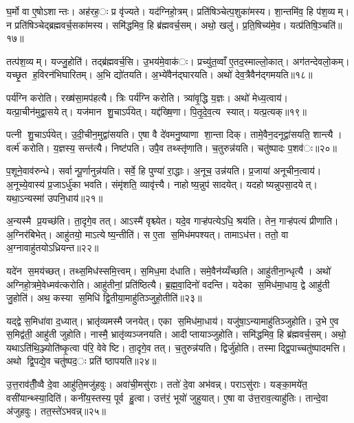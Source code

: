 घ॒र्मो वा ए॒षोऽशान्तः। अह॑रह॒ः प्र वृ॑ज्यते। यद॑ग्निहो॒त्रम्। प्रति॑षिञ्चेत्प॒शुका॑मस्य। शा॒न्तमि॑व॒ हि प॑श॒व्यम्। न प्रति॑षिञ्चेद्ब्रह्मवर्च॒सका॑मस्य। समि॑द्धमिव॒ हि ब्र॑ह्मवर्च॒सम्। अथो॒ खलु॑। प्र॒ति॒षिच्य॑मे॒व। यत्प्र॑तिषि॒ञ्चति॑॥१७॥

तत्प॑श॒व्यम्। यज्जु॒होति॑। तद्ब्र॑ह्मवर्च॒सि। उ॒भय॑मे॒वाक॑ः। प्रच्यु॑त॒व्वाँ ए॒तद॒स्माल्लो॒कात्। अग॑तन्देवलो॒कम्। यच्छृ॒त ह॒विरन॑भिघारितम्। अ॒भि द्यो॑तयति। अ॒भ्ये॑वैन॑द्घारयति। अथो॑ देव॒त्रैवैन॑द्गमयति॥१८॥

पर्य॑ग्नि करोति। रख्ष॑सा॒मप॑हत्यै। त्रिः पर्य॑ग्नि करोति। त्र्या॑वृ॒द्धि य॒ज्ञः। अथो॑ मेध्य॒त्वाय॑। यत्प्रा॒चीन॑मुद्वा॒सयेत्। यज॑मान शु॒चाऽर्प॑येत्। यद्द॑ख्षि॒णा। पि॒तृ॒दे॒व॒त्य स्यात्। यत्प्र॒त्यक्॥१९॥

पत्नी शु॒चाऽर्प॑येत्। उ॒दी॒चीन॒मुद्वा॑सयति। ए॒षा वै दे॑वमनु॒ष्याणा शा॒न्ता दिक्। तामे॒वैन॒दनूद्वा॑सयति॒ शान्त्यै। वर्त्म॑ करोति। य॒ज्ञस्य॒ सन्त॑त्यै। निष्ट॑पति। उपै॒व तथ्स्तृ॑णाति। च॒तुरुन्न॑यति। चतु॑ष्पादः प॒शव॑ः॥२०॥

प॒शूने॒वाव॑रुन्धे। सर्वान्पू॒र्णानुन्न॑यति। सर्वे॒ हि पुण्या॑ रा॒द्धाः। अ॒नूच॒ उन्न॑यति। प्र॒जाया॑ अनूचीन॒त्वाय॑। अ॒नूच्ये॒वास्य॑ प्र॒जाऽर्धु॑का भवति। संमृ॑शति॒ व्यावृ॑त्त्यै। नाहोष्य॒न्नुप॑ सादयेत्। यदहोष्यन्नुपसा॒दयेत्। यथा॒ऽन्यस्मा॑ उपनि॒धाय॑॥२१॥

अ॒न्यस्मै प्र॒यच्छ॑ति। ता॒दृगे॒व तत्। आऽस्मै॑ वृश्च्येत। यदे॒व गाऱ्ह॑पत्येऽधि॒ श्रय॑ति। तेन॒ गाऱ्ह॑पत्यं प्रीणाति। अ॒ग्निर॑बिभेत्। आहु॑तयो॒ माऽत्येष्य॒न्तीति॑। स ए॒ता स॒मिध॑मपश्यत्। तामाऽध॑त्त। ततो॒ वा अ॒ग्नावाहु॑तयोऽध्रियन्त॥२२॥

यदे॑न स॒मय॑च्छत्। तथ्स॒मिध॑स्समि॒त्त्वम्। स॒मिध॒मा द॑धाति। समे॒वैन॑य्यँच्छति। आहु॑तीना॒न्धृत्यै। अथो॑ अग्निहो॒त्रमे॒वेध्मव॑त्करोति। आहु॑तीनां॒ प्रति॑ष्ठित्यै। ब्र॒ह्म॒वा॒दिनो॑ वदन्ति। यदेका स॒मिध॑मा॒धाय॒ द्वे आहु॑ती जु॒होति॑। अथ॒ कस्या स॒मिधि॑ द्वि॒तीया॒माहु॑तिञ्जुहो॒तीति॑॥२३॥

यद्द्वे स॒मिधा॑वा द॒ध्यात्। भ्रातृ॑व्यमस्मै जनयेत्। एका स॒मिध॑मा॒धाय॑। यजु॑षा॒ऽन्यामाहु॑तिञ्जुहोति। उ॒भे ए॒व स॒मिद्व॑ती॒ आहु॑ती जुहोति। नास्मै॒ भ्रातृ॑व्यञ्जनयति। आदीप्तायाञ्जुहोति। समि॑द्धमिव॒ हि ब्र॑ह्मवर्च॒सम्। अथो॒ यथाऽति॑थि॒ञ्ज्योति॑ष्कृ॒त्वा प॑रि॒ वेवेष्टि। ता॒दृगे॒व तत्। च॒तुरुन्न॑यति। द्विर्जु॑होति। तस्माद्द्वि॒पाच्चतु॑ष्पादमत्ति। अथो द्वि॒पद्ये॒व चतु॑ष्पद॒ः प्रति॑ ष्ठापयति॥२४॥


उ॒त्त॒राव॑तीँ॒व्वै दे॒वा आहु॑ति॒मजु॑हवुः। अवा॑ची॒मसु॑राः। ततो॑ दे॒वा अभ॑वन्न्। पराऽसु॑राः। यङ्का॒मये॑त॒ वसी॑यान्थ्स्या॒दिति॑। कनी॑य॒स्तस्य॒ पूर्व हु॒त्वा। उत्त॑रं॒ भूयो॑ जुहुयात्। ए॒षा वा उ॑त्त॒राव॒त्याहु॑तिः। तान्दे॒वा अ॑जुहवुः। तत॒स्ते॑ऽभवन्न्॥२५॥

